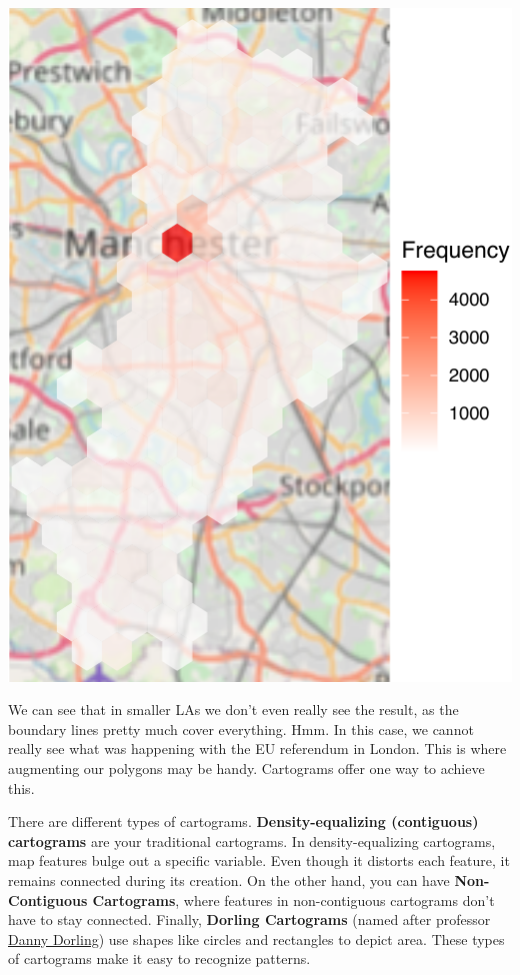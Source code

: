 \documentclass[
]{book}
\begin{document}
\includegraphics{crime_mapping_files/figure-latex/unnamed-chunk-126-1.pdf}

We can see that in smaller LAs we don't even really see the result, as the boundary lines pretty much cover everything. Hmm. In this case, we cannot really see what was happening with the EU referendum in London. This is where augmenting our polygons may be handy. Cartograms offer one way to achieve this.

There are different types of cartograms. \textbf{Density-equalizing (contiguous) cartograms} are your traditional cartograms. In density-equalizing cartograms, map features bulge out a specific variable. Even though it distorts each feature, it remains connected during its creation. On the other hand, you can have \textbf{Non-Contiguous Cartograms}, where features in non-contiguous cartograms don't have to stay connected. Finally, \textbf{Dorling Cartograms} (named after professor \href{https://www.geog.ox.ac.uk/staff/ddorling.html}{Danny Dorling}) use shapes like circles and rectangles to depict area. These types of cartograms make it easy to recognize patterns.
\end{document}
